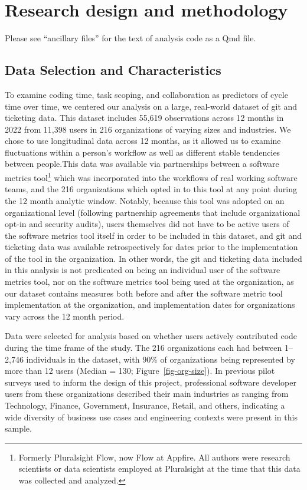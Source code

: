 \documentclass[
]{article}
\begin{document}
\section{Research design and
methodology}\label{research-design-and-methodology}

Please see ``ancillary files'' for the text of analysis code as a Qmd
file.

\subsection{Data Selection and
Characteristics}\label{data-selection-and-characteristics}

To examine coding time, task scoping, and collaboration as predictors of
cycle time over time, we centered our analysis on a large, real-world
dataset of git and ticketing data. This dataset includes 55,619
observations across 12 months in 2022 from 11,398 users in 216
organizations of varying sizes and industries. We chose to use
longitudinal data across 12 months, as it allowed us to examine
fluctuations within a person's workflow as well as different stable
tendencies between people.This data was available via partnerships
between a software metrics tool\footnote{Formerly Pluralsight Flow, now
  Flow at Appfire. All authors were research scientists or data
  scientists employed at Pluralsight at the time that this data was
  collected and analyzed.} which was incorporated into the workflows of
real working software teams, and the 216 organizations which opted in to
this tool at any point during the 12 month analytic window. Notably,
because this tool was adopted on an organizational level (following
partnership agreements that include organizational opt-in and security
audits), users themselves did not have to be active users of the
software metrics tool itself in order to be included in this dataset,
and git and ticketing data was available retrospectively for dates prior
to the implementation of the tool in the organization. In other words,
the git and ticketing data included in this analysis is not predicated
on being an individual user of the software metrics tool, nor on the
software metrics tool being used at the organization, as our dataset
contains measures both before and after the software metric tool
implementation at the organization, and implementation dates for
organizations vary across the 12 month period.

Data were selected for analysis based on whether users actively
contributed code during the time frame of the study. The 216
organizations each had between 1--2,746 individuals in the dataset, with
90\% of organizations being represented by more than 12 users (Median =
130; Figure~\ref{fig-org-size}). In previous pilot surveys used to
inform the design of this project, professional software developer users
from these organizations described their main industries as ranging from
Technology, Finance, Government, Insurance, Retail, and others,
indicating a wide diversity of business use cases and engineering
contexts were present in this sample.
\end{document}

